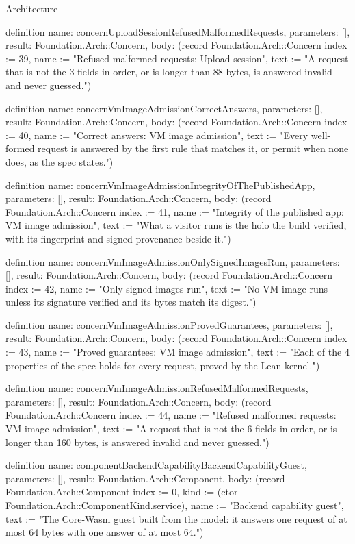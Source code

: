 \begin{lexlean}{Architecture}
\begin{semanticmodule}
definition{
  name: concernUploadSessionRefusedMalformedRequests,
  parameters: [],
  result: Foundation.Arch::Concern,
  body: (record Foundation.Arch::Concern {index := 39, name := "Refused malformed requests: Upload session", text := "A request that is not the 3 fields in order, or is longer than 88 bytes, is answered invalid and never guessed."})
}

definition{
  name: concernVmImageAdmissionCorrectAnswers,
  parameters: [],
  result: Foundation.Arch::Concern,
  body: (record Foundation.Arch::Concern {index := 40, name := "Correct answers: VM image admission", text := "Every well-formed request is answered by the first rule that matches it, or permit when none does, as the spec states."})
}

definition{
  name: concernVmImageAdmissionIntegrityOfThePublishedApp,
  parameters: [],
  result: Foundation.Arch::Concern,
  body: (record Foundation.Arch::Concern {index := 41, name := "Integrity of the published app: VM image admission", text := "What a visitor runs is the holo the build verified, with its fingerprint and signed provenance beside it."})
}

definition{
  name: concernVmImageAdmissionOnlySignedImagesRun,
  parameters: [],
  result: Foundation.Arch::Concern,
  body: (record Foundation.Arch::Concern {index := 42, name := "Only signed images run", text := "No VM image runs unless its signature verified and its bytes match its digest."})
}

definition{
  name: concernVmImageAdmissionProvedGuarantees,
  parameters: [],
  result: Foundation.Arch::Concern,
  body: (record Foundation.Arch::Concern {index := 43, name := "Proved guarantees: VM image admission", text := "Each of the 4 properties of the spec holds for every request, proved by the Lean kernel."})
}

definition{
  name: concernVmImageAdmissionRefusedMalformedRequests,
  parameters: [],
  result: Foundation.Arch::Concern,
  body: (record Foundation.Arch::Concern {index := 44, name := "Refused malformed requests: VM image admission", text := "A request that is not the 6 fields in order, or is longer than 160 bytes, is answered invalid and never guessed."})
}

definition{
  name: componentBackendCapabilityBackendCapabilityGuest,
  parameters: [],
  result: Foundation.Arch::Component,
  body: (record Foundation.Arch::Component {index := 0, kind := (ctor Foundation.Arch::ComponentKind.service), name := "Backend capability guest", text := "The Core-Wasm guest built from the model: it answers one request of at most 64 bytes with one answer of at most 64."})
}


\end{semanticmodule}
\end{lexlean}
